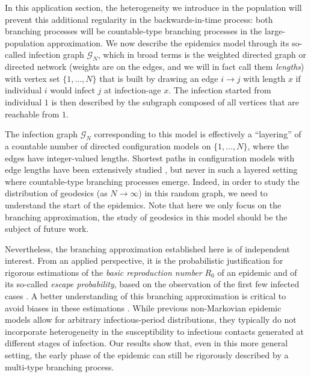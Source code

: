 \begin{refsegment}
In this application section, the heterogeneity we introduce in the
population will prevent this additional regularity in the
backwards-in-time process: both branching processes will be
countable-type branching processes in the large-population
approximation. We now describe the epidemics model through its
so-called infection graph $\mathcal{G}_N$, which in broad terms is the
weighted directed graph or directed network (weights are on the edges,
and we will in fact call them \emph{lengths}) with vertex set
$\{1,\dots,N\}$ that is built by drawing an edge $i\to j$ with length
$x$ if individual $i$ would infect $j$ at infection-age $x$. The
infection started from individual $1$ is then described by the
subgraph composed of all vertices that are reachable from $1$.

The infection graph $\mathcal{G}_N$ corresponding to this model is
effectively a ``layering'' of a countable number of directed
configuration models on $\{1, \dots, N\}$, where the edges have
integer-valued lengths. Shortest paths in configuration models with
edge lengths have been extensively studied \citep[see
\emph{e.g.}][]{BHH10,bhamidi_front_2014,vO18}, but never in such a
layered setting where countable-type branching processes emerge.
Indeed, in order to study the distribution of geodesics (as
$N\to\infty$) in this random graph, we need to understand the start of
the epidemics. Note that here we only focus on the branching
approximation, the study of geodesics in this model should be the
subject of future work.

Nevertheless, the branching approximation established here is
  of independent interest. From an applied perspective, it is the
  probabilistic justification for rigorous estimations of the
  \emph{basic reproduction number} $R_0$ of an epidemic and of its
  so-called \emph{escape probability}, based on the observation of the
  first few infected cases \citep[see \textit{e.g.} Part
  I.1.2 in][]{BP19}. A better understanding of this branching
  approximation is critical to avoid biases in these estimations
  \citep{BS19}. While previous non-Markovian epidemic models allow for
  arbitrary infectious-period distributions, they typically do not
  incorporate heterogeneity in the susceptibility to infectious
  contacts generated at different stages of infection. Our results
  show that, even in this more general setting, the early phase of the
  epidemic can still be rigorously described by a multi-type branching
  process.


\end{refsegment}
